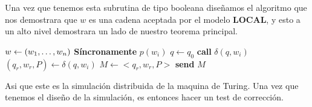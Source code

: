 \documentclass[10pt]{article}
\begin{document}
    Una vez que tenemos esta subrutina de tipo booleana diseñamos el algoritmo que nos demostrara que $w$ es una cadena
    aceptada por el modelo \textbf{LOCAL}, y esto a un alto nivel demostrara un lado de nuestro teorema principal.\\

    \begin{algorithm}
        \begin{algorithmic}
            \STATE $w\gets(w_{1},\mathellipsis, w_{n})$
            \STATE \textbf{Síncronamente}
               \STATE $p(w_{i})$
               \STATE $q\gets q_{0}$
                 \STATE \textbf{call} $\delta(q,w_{i})$
                 \STATE $(q_{r},w_{r},P) \gets \delta(q,w_{i})$
               \ENDWHILE
               \ELSE
                  \STATE $M \gets <q_{r},w_{r},P>$
                  \STATE \textbf{send} $M$
               \ENDIF
            \ENDFOR
        \end{algorithmic}
        \caption{$Simulate\char95 Algo\char95 TM(w,G,TM)$\label{lss}}
    \end{algorithm}
    Asi que este es la simulación distribuida de la maquina de Turing.
    Una vez que tenemos el diseño de la simulación, es entonces hacer un test de corrección.
    \\\\
\end{document}
